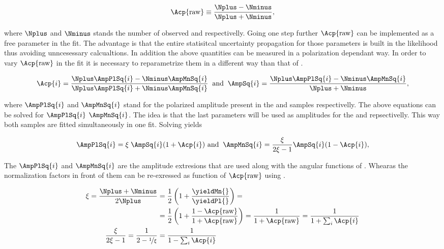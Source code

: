 \begin{equation}
\Acp{\text{raw}} \equiv \frac{\Nplus - \Nminus}{\Nplus + \Nminus},
\label{acp_mes}
\end{equation}

\noindent where $\Nplus$ and $\Nminus$ stands the number of observed \BsbarJpsiKst and \BsJpsiKst respectivelly. 
Going one step further $\Acp{\text{raw}}$ can be implemented as a free parameter in the fit. The advantage
is that the entire statisitcal uncertainty propagation for those parameters is built in the likelihood thus avoiding
unncesessary calcualtions. In addition the above quantities can be measured in a polarization dependant way. In order
to vary $\Acp{\text{raw}}$ in the fit it is necessary to reparametrize them in a different way than that of .

\begin{equation}
\Acp{i} = \frac{\Nplus\AmpPlSq{i} - \Nminus\AmpMnSq{i}}{\Nplus\AmpPlSq{i} + \Nminus\AmpMnSq{i} }\;\; \text{and} \;\;
\AmpSq{i} = \frac{ \Nplus \AmpPlSq{i} - \Nminus\AmpMnSq{i}}{\Nplus + \Nminus},
\label{acp_param}
\end{equation}

\noindent where $\AmpPlSq{i}$ and $\AmpMnSq{i}$ stand for the polarized amplitude present in the \BsbarJpsiKst
and \BsJpsiKst samples respectivelly. The above equations can be solved for $\AmpPlSq{i}$  $\AmpMnSq{i}$. The idea
is that the last parameters will be used as amplitudes for the \BsbarJpsiKst and \BsJpsiKst \pdfs repsectivelly.
This way both samples are fitted simultaneously in one fit. Solving  yields 

\begin{equation}
\AmpPlSq{i} = \xi \; \AmpSq{i} (1+\Acp{i}) \,\, \text{and}\;\; \AmpMnSq{i} = \frac{\xi}{2\xi-1} \AmpSq{i} (1-\Acp{i}),
\label{acp_free}
\end{equation}

\noindent The $\AmpPlSq{i}$ and $\AmpMnSq{i}$ are the amplitude extresions that are used along with the angular functions of .
Whearas the normalization factors in front of them can be re-exressed as function of $\Acp{\text{raw}}$ using .

\begin{align}
\xi = \frac{\Nplus+\Nminus}{2\Nplus} &= \frac{1}{2}\left( 1 + \frac{\yieldMn{}}{\yieldPl{}}\right) = \nonumber \\ 
                                     &= \frac{1}{2}\left( 1 + \frac{1-\Acp{\text{raw}}}{1+\Acp{\text{raw}}}\right) =
                                        \frac{1}{1+\Acp{\text{raw}}} = 
                                        \frac{1}{1+\sum_i\Acp{i}} \\
\frac{\xi}{2\xi-1} = \frac{1}{2-\nicefrac{1}{\xi}} &= \frac{1}{1-\sum_i\Acp{i}}
\label{amp_norms}
\end{align}

